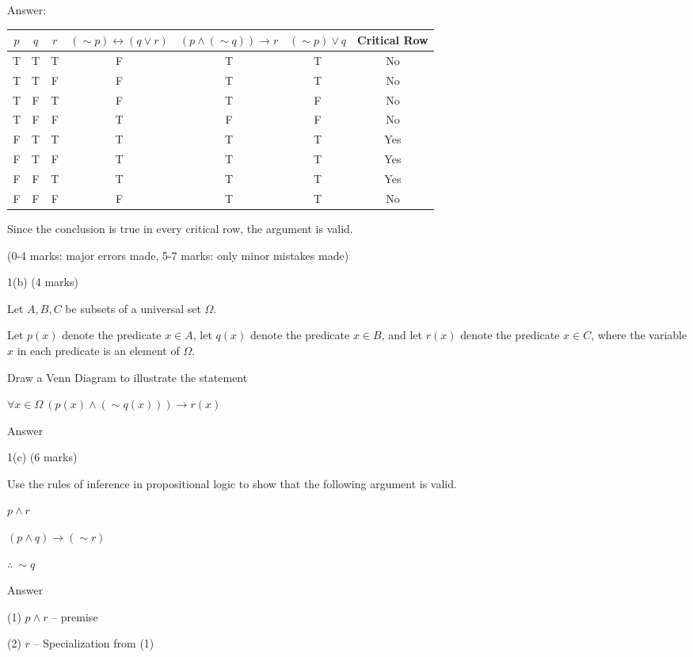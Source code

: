 \documentclass[a4paper,12pt,oneside]{book}
\theoremstyle{definition}
\begin{document}
Answer:

\begin{center}
	\begin{tabular}{|ccc|c|c|c|c|}
		\hline
		$p$ & $q$ & $r$ &$(\sim p) \leftrightarrow (q \vee r)$ & $(p \wedge (\sim q)) \rightarrow r$ & $(\sim p) \vee q$ & Critical Row \\
		\hline
		T & T & T & F & T & T & No \\
		\hline
		T & T & F & F & T & T & No \\
		\hline
		T & F & T & F & T & F & No \\
		\hline
		T & F & F & T & F & F & No \\
		\hline
		F & T & T & T & T & T & Yes \\
		\hline
		F & T & F & T & T & T & Yes \\
		\hline
		F & F & T & T & T & T & Yes \\
		\hline
		F & F & F & F & T & T & No \\
		\hline  
	\end{tabular} 
\end{center}

Since the conclusion is true in every critical row, the argument is valid.

(0-4 marks: major errors made, 5-7 marks: only minor mistakes made)

1(b) (4 marks)

Let $A,B,C$ be subsets of a universal set $\Omega$.

Let $p(x)$ denote the predicate $x \in A$, let $q(x)$ denote the predicate $x \in B$, and let $r(x)$ denote the predicate $x \in C$, where the variable $x$ in each predicate is an element of $\Omega$.

Draw a Venn Diagram to illustrate the statement

$\forall x \in \Omega \ (p(x) \wedge (\sim q(x))) \rightarrow r(x)$

Answer

1(c) (6 marks)

Use the rules of inference in propositional logic to show that the following argument is valid.

$p \wedge r$

$(p \wedge q) \rightarrow (\sim r)$

$\therefore \ \sim q$

Answer

(1) $p \wedge r$ -- premise

(2) $r$ -- Specialization from (1)
\end{document}
